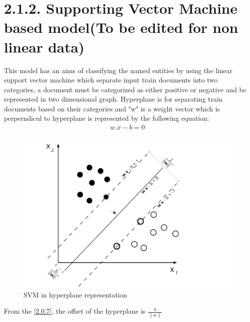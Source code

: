 \section*{2.1.2.  Supporting Vector Machine based model(To be edited for non linear data)}
This model has an aims of classifying the named entities by using the linear support vector machine which separate input train documents into two categories, a document must be categorized as either positive or negative and be represented in two dimensional graph.
Hyperplane is for separating train documents based on their categories and "w" is a weight vector  which is perperndicul to hyperplane is represented by the following equation: 
\begin{align}
w.x- b = 0 \label{2.0.7}
\end{align}
\begin{figure}[hbtp]
\caption{SVM in hyperplane representation}
\centering
\includegraphics[scale=.7]{images/svm.png}
\end{figure}

 

From the \eqref{2.0.7}, the offset of the hyperplane is $ \frac{b}{\parallel  w \parallel} $

